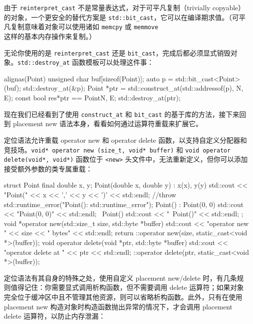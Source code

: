 由于 \texttt{reinterpret\_\allowbreak{}cast} 不是常量表达式，对于可平凡复制（trivially copyable）的对象，一个更安全的替代方案是 \texttt{std::\allowbreak{}bit\_\allowbreak{}cast}，它可以在编译期求值。（可平凡复制意味着对象可以使用诸如 \texttt{memcpy} 或 \texttt{memmove} 这样的基本内存操作来复制。）

无论你使用的是 \texttt{reinterpret\_\allowbreak{}cast} 还是 \texttt{bit\_cast}，完成后都必须显式销毁对象。\texttt{std::\allowbreak{}destroy\_\allowbreak{}at} 函数模板可以处理这件事：

\begin{codebox}[cpp]
alignas(Point) unsigned char buf[sizeof(Point)];
auto p = std::bit_cast<Point>(buf);
std::destroy_at(&p);
Point *ptr = std::construct_at(std::addressof(p), N, E);
const bool res{*ptr == Point{N, E}};
std::destroy_at(ptr);
\end{codebox}

现在我们已经看到了使用 \texttt{construct\_\allowbreak{}at} 和 \texttt{bit\_cast} 的基于库的方法，接下来回到 placement new 语法本身，看看如何通过运算符重载来扩展它。

\label{idx:615}
定位语法允许重载 operator new 和 operator delete 函数，以支持自定义分配器和竞技场。\texttt{void* operator new (\allowbreak{}size\_\allowbreak{}t,\allowbreak{} void* buffer)\allowbreak{}} 和 \texttt{void operator delete(\allowbreak{}void*,\allowbreak{} void*)\allowbreak{}} 函数位于 \texttt{<new>} 头文件中，无法重新定义，但你可以添加接受额外参数的类专属重载：

\begin{codebox}[cpp]
struct Point final {
    double x, y;
    Point(double x, double y) : x(x), y(y) {
        std::cout << "Point(" << x << ',' << y << ')' << std::endl;
        //throw std::runtime_error("Point(): std::runtime_error");
    }
    Point() : Point(0, 0) { std::cout << "Point(0, 0)" << std::endl; }
    ~Point() { std::cout << "~Point()" << std::endl; }
};
void *operator new(std::size_t size, std::byte *buffer) {
    std::cout << "operator new " << size << " bytes" << std::endl;
    return ::operator new(size, static_cast<void *>(buffer));
}
void operator delete(void *ptr, std::byte *buffer) {
    std::cout << "operator delete at " << ptr << std::endl;
    ::operator delete(ptr, static_cast<void *>(buffer));
}
\end{codebox}

\label{idx:616}
定位语法有其自身的特殊之处，使用自定义 placement new/delete 时，有几条规则值得记住：你需要显式调用析构函数，但不需要调用 delete 运算符；如果对象完全位于缓冲区中且不管理其他资源，则可以省略析构函数。此外，只有在使用 placement new 构造对象时构造函数抛出异常的情况下，才会调用 placement delete 运算符，以防止内存泄漏：

